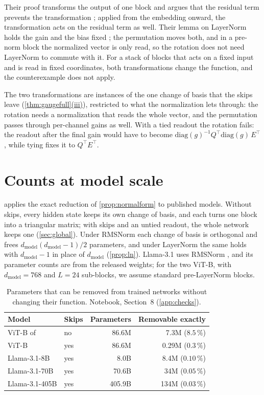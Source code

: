 \documentclass[10pt]{article}
\theoremstyle{definition}
\theoremstyle{remark}
\newcommand{\dm}{d_{\mathrm{model}}}
\DeclareRobustCommand{\cpref}[2]{\hyperref[#1:#2]{\cref*{#1}(#2)}}
\begin{document}
Their proof transforms the output of one block and argues that the residual term prevents the transformation \citep[Theorem~30]{wang2025gauge}; applied from the embedding onward, the transformation acts on the residual term as well. Their lemma on LayerNorm holds the gain and the bias fixed \citep[Lemma~26]{wang2025gauge}; the permutation moves both, and in a pre-norm block the normalized vector is only read, so the rotation does not need LayerNorm to commute with it. For a stack of blocks that acts on a fixed input and is read in fixed coordinates, both transformations change the function, and the counterexample does not apply.

The two transformations are instances of the one change of basis that the skips leave (\cpref{thm:gaugefull}{iii}), restricted to what the normalization lets through: the rotation needs a normalization that reads the whole vector, and the permutation passes through per-channel gains as well. With a tied readout the rotation fails: the readout after the final gain would have to become $\mathrm{diag}(g)^{-1}Q^\top\mathrm{diag}(g)\,E^\top$, while tying fixes it to $Q^\top E^\top$.

\FloatBarrier
\section{Counts at model scale}\label{app:scale}

 applies the exact reduction of \cref{prop:normalform} to published models. Without skips, every hidden state keeps its own change of basis, and each turns one block into a triangular matrix; with skips and an untied readout, the whole network keeps one (\cref{sec:global}). Under RMSNorm each change of basis is orthogonal and frees $\dm(\dm-1)/2$ parameters, and under LayerNorm the same holds with $\dm - 1$ in place of $\dm$ (\cref{prop:ln}). Llama-3.1 uses RMSNorm \citep{grattafiori2024llama3}, and its parameter counts are from the released weights; for the two ViT-B, with $\dm = 768$ and $L = 24$ sub-blocks, we assume standard pre-LayerNorm blocks.

\begin{table}[ht]
\centering\small
\caption{Parameters that can be removed from trained networks without changing their function. Notebook, Section~8 (\cref{app:checks}).}
\label{tab:scale}
\begin{tabular}{llrr}
\toprule
Model & Skips & Parameters & Removable exactly \\
\midrule
ViT-B of \citet{ji2026cutting} & no & 86.6M & 7.3M ($8.5\,\%$) \\
ViT-B & yes & 86.6M & 0.29M ($0.3\,\%$) \\
\midrule
Llama-3.1-8B & yes & 8.0B & 8.4M ($0.10\,\%$) \\
Llama-3.1-70B & yes & 70.6B & 34M ($0.05\,\%$) \\
Llama-3.1-405B & yes & 405.9B & 134M ($0.03\,\%$) \\
\bottomrule
\end{tabular}
\end{table}
\end{document}
